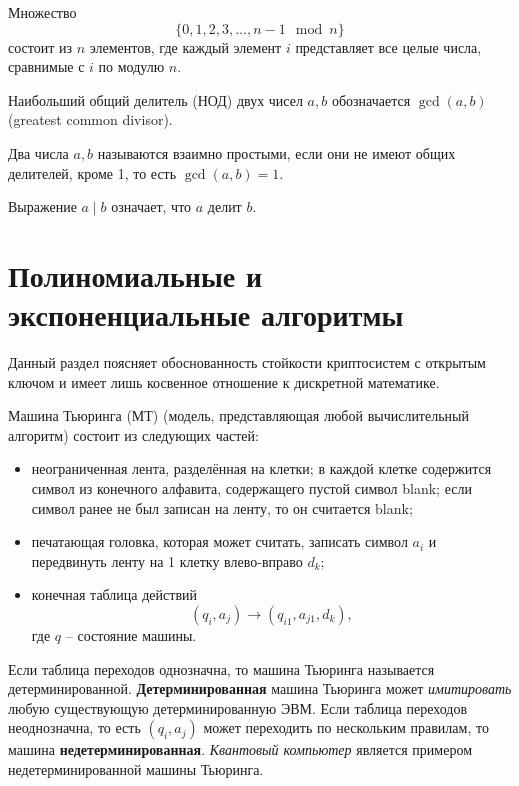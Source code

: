 \documentclass[10pt,a4paper,openany]{book}
\begin{document}
Множество
    \[ \{ 0, 1, 2, 3, \dots, n-1 \mod n\} \]
состоит из $n$ элементов, где каждый элемент $i$ представляет все целые числа, сравнимые с $i$ по модулю $n$.

Наибольший общий делитель (НОД) двух чисел $a,b$ обозначается $\gcd(a,b)$ (greatest common divisor).

Два числа $a,b$ называются взаимно простыми, если они не имеют общих делителей, кроме 1, то есть $\gcd(a,b) = 1$.

Выражение $a \mid b$ означает, что $a$ делит $b$.













\section[Полиномиальные и экспоненциальные алгоритмы]{Полиномиальные и \\ экспоненциальные алгоритмы}

Данный раздел поясняет обоснованность стойкости криптосистем с открытым ключом и имеет лишь косвенное отношение к дискретной математике.

Машина Тьюринга (МТ) (модель, представляющая любой вычислительный алгоритм) состоит из следующих частей:
\begin{itemize}
    \item неограниченная лента, разделённая на клетки; в каждой клетке содержится символ из конечного алфавита, содержащего пустой символ blank; если символ ранее не был записан на ленту, то он считается blank;
    \item печатающая головка, которая может считать, записать символ $a_i$ и передвинуть ленту на 1 клетку влево-вправо $d_k$;
    \item конечная таблица действий
    \[ (q_i, a_j) \rightarrow (q_{i1}, a_{j1}, d_k), \]
где $q$ -- состояние машины.
\end{itemize}

Если таблица переходов однозначна, то машина Тьюринга называется детерминированной. \textbf{Детерминированная} машина Тьюринга может \emph{имитировать} любую существующую детерминированную ЭВМ. Если таблица переходов неоднозначна, то есть $(q_i, a_j)$ может переходить по нескольким правилам, то машина \textbf{недетерминированная}. \emph{Квантовый компьютер} является примером недетерминированной машины Тьюринга.
\end{document}
